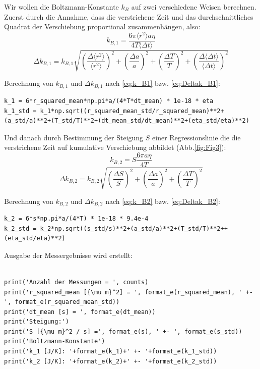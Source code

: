\documentclass[a4paper,10pt]{article}
\begin{document}
Wir wollen die Boltzmann-Konstante \(k_{B}\) auf zwei verschiedene Weisen berechnen. Zuerst durch die Annahme, dass die verstrichene Zeit und das durchschnittliches Quadrat der Verschiebung proportional zusammenhängen, also: 
\begin{equation} \label{eq:k_B1}
	k_{B,1} = \frac{6 \pi  \langle r^2 \rangle a \eta}{4 T \langle \Delta t \rangle}
\end{equation} 
\begin{equation} \label{eq:Deltak_B1}
	\Delta k_{B,1} = k_{B,1} \sqrt{{\left(\frac{\Delta \langle r^2 \rangle}{\langle r^2 \rangle}\right)}^2+{\left(\frac{\Delta a}{a}\right)}^2+{\left(\frac{\Delta T}{T}\right)}^2+{\left(\frac{\Delta \langle \Delta t \rangle}{\langle \Delta t \rangle}\right)}^2}
\end{equation} 

Berechnung von \(k_{B,1}\) und \(\Delta k_{B,1}\) nach \eqref{eq:k_B1} bzw. \eqref{eq:Deltak_B1}:\begin{lstlisting}
k_1 = 6*r_squared_mean*np.pi*a/(4*T*dt_mean) * 1e-18 * eta
k_1_std = k_1*np.sqrt((r_squared_mean_std/r_squared_mean)**2+(a_std/a)**2+(T_std/T)**2+(dt_mean_std/dt_mean)**2+(eta_std/eta)**2)

\end{lstlisting}

Und danach durch Bestimmung der Steigung \(S\) einer Regressionslinie die die verstrichene Zeit auf kumulative Verschiebung abbildet (Abb.\ref{fig:Fig3}):
\begin{equation} \label{eq:k_B2}
	k_{B,2} = S \frac{6 \pi a \eta}{4 T}
\end{equation} 
\begin{equation} \label{eq:Deltak_B2}
	\Delta k_{B,2} = k_{B,2} \sqrt{{\left(\frac{\Delta S}{S}\right)}^2+{\left(\frac{\Delta a}{a}\right)}^2+{\left(\frac{\Delta T}{T}\right)}^2}
\end{equation} 

Berechnung von \(k_{B,2}\) und \(\Delta k_{B,2}\) nach \eqref{eq:k_B2} bzw. \eqref{eq:Deltak_B2}:\begin{lstlisting}
k_2 = 6*s*np.pi*a/(4*T) * 1e-18 * 9.4e-4
k_2_std = k_2*np.sqrt((s_std/s)**2+(a_std/a)**2+(T_std/T)**2++(eta_std/eta)**2)

\end{lstlisting}

Ausgabe der Messergebnisse wird erstellt:\begin{lstlisting}

print('Anzahl der Messungen = ', counts)
print('r_squared_mean [{\mu m}^2] = ', format_e(r_squared_mean), ' +- ', format_e(r_squared_mean_std))
print('dt_mean [s] = ', format_e(dt_mean))
print('Steigung:')
print('S [{\mu m}^2 / s] =', format_e(s), ' +- ', format_e(s_std))
print('Boltzmann-Konstante')
print('k_1 [J/K]: '+format_e(k_1)+' +- '+format_e(k_1_std))
print('k_2 [J/K]: '+format_e(k_2)+' +- '+format_e(k_2_std))
\end{lstlisting}
\end{document}
